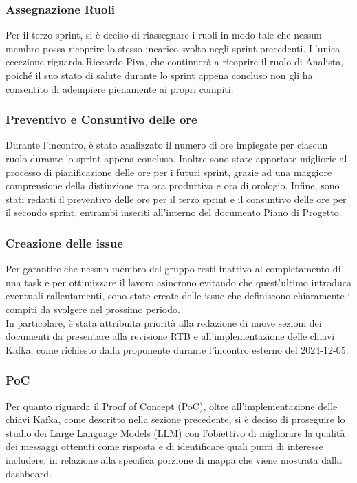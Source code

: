 \documentclass[10pt]{article}
\begin{document}
\subsubsection{Assegnazione Ruoli}
Per il terzo sprint, si è deciso di riassegnare i ruoli in modo tale che nessun membro possa ricoprire lo stesso incarico svolto negli sprint precedenti. L'unica eccezione riguarda Riccardo Piva, che continuerà a ricoprire il ruolo di Analista, poiché il suo stato di salute durante lo sprint appena concluso non gli ha consentito di adempiere pienamente ai propri compiti.\\

\subsubsection{Preventivo e Consuntivo delle ore}
Durante l'incontro, è stato analizzato il numero di ore impiegate per ciascun ruolo durante lo sprint appena concluso. Inoltre sono state apportate migliorie al processo di pianificazione delle ore per i futuri sprint, grazie ad una maggiore comprensione della distinzione tra ora produttiva e ora di orologio. Infine, sono stati redatti il preventivo delle ore per il terzo sprint e il consuntivo delle ore per il secondo sprint, entrambi inseriti all'interno del documento Piano di Progetto.\\

\subsubsection{Creazione delle issue}
Per garantire che nessun membro del gruppo resti inattivo al completamento di una task e per ottimizzare il lavoro asincrono evitando che quest'ultimo introduca eventuali rallentamenti, sono state create delle issue che definiscono chiaramente i compiti da svolgere nel prossimo periodo.\\
In particolare, è stata attribuita priorità alla redazione di nuove sezioni dei documenti da presentare alla revisione RTB e all'implementazione delle chiavi Kafka, come richiesto dalla proponente durante l'incontro esterno del 2024-12-05.\\

\subsubsection{PoC}
Per quanto riguarda il Proof of Concept (PoC), oltre all'implementazione delle chiavi Kafka, come descritto nella sezione precedente, si è deciso di proseguire lo studio dei Large Language Models (LLM) con l'obiettivo di migliorare la qualità dei messaggi ottenuti come risposta e di identificare quali punti di interesse includere, in relazione alla specifica porzione di mappa che viene mostrata dalla dashboard.\\
\end{document}
